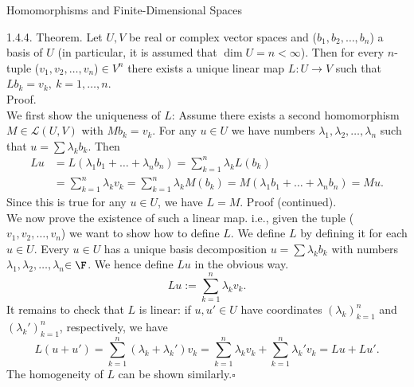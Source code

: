 \documentclass[smaller,hyperref={CJKbookmarks=true}]{beamer}
\newcommand{\myseries}[2]{$#1_1,#1_2,\dots,#1_#2$}
\begin{document}
\begin{frame}{Homomorphisms and Finite-Dimensional Spaces}
\begin{spacing}{1}
\alert{1.4.4. Theorem.} Let $U,V$ be real or complex vector spaces and (\myseries{b}{n}) a basis of $U$ (in particular, it is assumed that $\dim U=n<\infty$). Then for every $n$-tuple (\myseries{v}{n})$\in V^n$ there exists a unique linear map $L:U\to V$ such that $Lb_k=v_k,~k=1,\ldots,n.$\\[8pt]
\alert{Proof.}\\
We first show the uniqueness of $L$: Assume there exists a second homomorphism $M\in\mathcal{L}(U,V)$ with $Mb_k=v_k$. For any $u\in U$ we have numbers \myseries{\lambda}{n} such that $u=\sum\lambda_kb_k$. Then
\begin{equation*}
  \begin{split}
     Lu &=L(\lambda_1b_1+\ldots+\lambda_nb_n)=\sum_{k=1}^{n}\lambda_kL(b_k) \\
     &=\sum_{k=1}^{n}\lambda_kv_k=\sum_{k=1}^{n}\lambda_kM(b_k)=M(\lambda_1b_1+\ldots+\lambda_nb_n)=Mu.
  \end{split}
\end{equation*}
Since this is true for any $u\in U$, we have $L=M$.
\newpage
\alert{Proof (continued).}\\
We now prove the existence of such a linear map. i.e., given the tuple (\myseries{v}{n}) we want to show how to define $L$. We define $L$ by defining it for each $u\in U$. Every $u\in U$ has a unique basis decomposition $u=\sum\lambda_kb_k$ with numbers \myseries{\lambda}{n}$\in\F$. We hence define $Lu$ in the obvious way.
\[Lu:=\sum_{k=1}^{n}\lambda_kv_k.\]
It remains to check that $L$ is linear: if $u,u'\in U$ have coordinates $(\lambda_k)_{k=1}^n$ and $(\lambda_k')_{k=1}^n$, respectively, we have
\[L(u+u')=\sum_{k=1}^{n}(\lambda_k+\lambda_k')v_k=\sum_{k=1}^{n}\lambda_kv_k+\sum_{k=1}^{n}\lambda_k'v_k=Lu+Lu'.\]
The homogeneity of $L$ can be shown similarly.$\square$
\end{spacing}
\end{frame}
\end{document}
